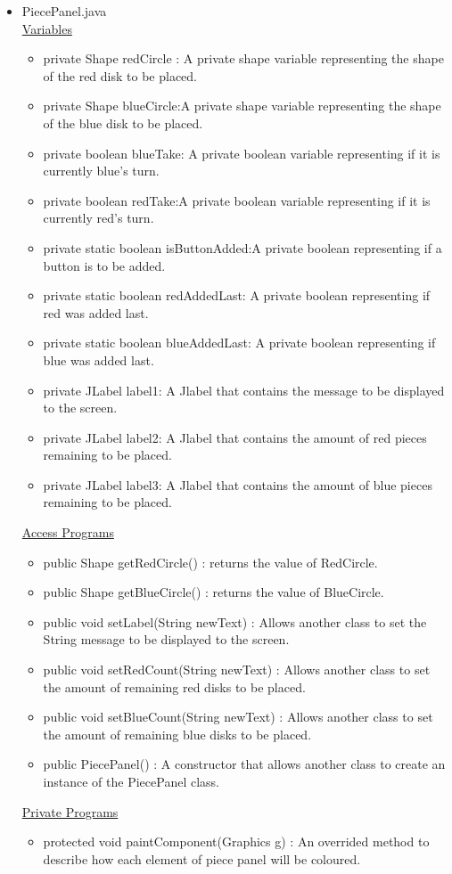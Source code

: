 \documentclass[12pt]{article}
\begin{document}
\begin{itemize}
		\item PiecePanel.java \\
		\underline{Variables}
		\begin{itemize}
			\item private Shape redCircle : A private shape variable representing the shape of the red disk to be placed.
			\item private Shape blueCircle:A private shape variable representing the shape of the blue disk to be placed.
			\item private boolean blueTake: A private boolean variable representing if it is currently blue's turn.
			\item private boolean redTake:A private boolean variable representing if it is currently red's turn.
			\item private static boolean isButtonAdded:A private boolean representing if a button is to be added.
			\item private static boolean redAddedLast: A private boolean representing if red was added last.
			\item private static boolean blueAddedLast: A private boolean representing if blue was added last.
			\item private JLabel label1: A Jlabel that contains the message to be displayed to the screen.
			\item private JLabel label2: A Jlabel that contains the amount of red pieces remaining to be placed.
			\item private JLabel label3: A Jlabel that contains the amount of blue pieces remaining to be placed.
		\end{itemize}
		\underline{Access Programs}
		\begin{itemize}
				\item public Shape getRedCircle() : returns the value of RedCircle.
				\item public Shape getBlueCircle() : returns the value of BlueCircle.
				\item public void setLabel(String newText) : Allows another class to set the String message to be displayed to the screen.
				\item public void setRedCount(String newText) : Allows another class to set the amount of remaining red disks to be placed.
				\item public void setBlueCount(String newText) : Allows another class to set the amount of remaining blue disks to be placed.
				\item public PiecePanel() : A constructor that allows another class to create an instance of the PiecePanel class.
		\end{itemize}
		\underline{Private Programs}
		\begin{itemize}
			\item protected void paintComponent(Graphics g) : An overrided method to describe how each element of piece panel will be coloured. 
		\end{itemize}


\end{itemize}
\end{document}
